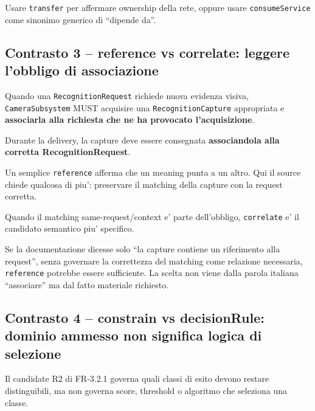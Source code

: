 \documentclass[11pt,a4paper]{article}
\newcommand{\code}[1]{\nolinkurl{#1}}
\begin{document}
\begin{badbox}
Usare \code{transfer} per affermare ownership della rete, oppure usare \code{consumeService} come sinonimo generico di ``dipende da''.
\end{badbox}


\subsection{Contrasto 3 -- reference vs correlate: leggere l'obbligo di associazione}

\begin{sourcebox}
Quando una \code{RecognitionRequest} richiede nuova evidenza visiva, \code{CameraSubsystem} MUST acquisire una \code{RecognitionCapture} appropriata e \textbf{associarla alla richiesta che ne ha provocato l'acquisizione}.

Durante la delivery, la capture deve essere consegnata \textbf{associandola alla corretta RecognitionRequest}.
\end{sourcebox}

Un semplice \code{reference} afferma che un meaning punta a un altro. Qui il source chiede qualcosa di piu': preservare il matching della capture con la request corretta.

\begin{goodbox}
Quando il matching same-request/context e' parte dell'obbligo, \code{correlate} e' il candidato semantico piu' specifico.
\end{goodbox}

\begin{reviewbox}
Se la documentazione dicesse solo ``la capture contiene un riferimento alla request'', senza governare la correttezza del matching come relazione necessaria, \code{reference} potrebbe essere sufficiente. La scelta non viene dalla parola italiana ``associare'' ma dal fatto materiale richiesto.
\end{reviewbox}


\subsection{Contrasto 4 -- constrain vs decisionRule: dominio ammesso non significa logica di selezione}

Il candidate R2 di FR-3.2.1 governa quali classi di esito devono restare distinguibili, ma non governa score, threshold o algoritmo che seleziona una classe.
\end{document}
